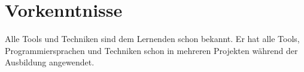 \section{Vorkenntnisse}
Alle Tools und Techniken sind dem Lernenden schon bekannt. Er hat alle Tools, Programmiersprachen und Techniken schon in mehreren Projekten während der Ausbildung angewendet.
